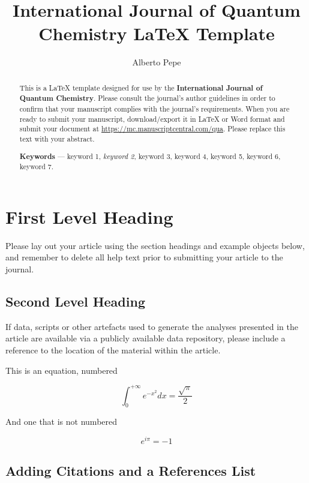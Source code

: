 \documentclass[num-refs]{wiley-article}
\title{International Journal of Quantum Chemistry LaTeX Template}
\author[1]{Alberto Pepe}
\affil[1]{Authorea}
\begin{document}
\maketitle
{}
\begin{abstract}
This is a LaTeX template designed for use by the \textbf{International Journal of Quantum Chemistry}. Please consult the journal's author guidelines in order to confirm that your manuscript complies with the journal's requirements. When you are ready to submit your manuscript, download/export it in LaTeX or Word format and submit your document at \href{https://mc.manuscriptcentral.com/qua}{https://mc.manuscriptcentral.com/qua}. Please replace this text with your abstract.

\textbf{Keywords} --- keyword 1, \emph{keyword 2}, keyword 3, keyword 4, keyword 5, keyword 6, keyword 7.%
\end{abstract}%




\section{First Level Heading}
Please lay out your article using the section headings and example objects below, and remember to delete all help text prior to submitting your article to the journal.

\subsection{Second Level Heading}
If data, scripts or other artefacts used to generate the analyses presented in the article are available via a publicly available data repository, please include a reference to the location of the material within the article.

This is an equation, numbered

\begin{equation}
\label{eqn:some}
\int_0^{+\infty}e^{-x^2}dx=\frac{\sqrt{\pi}}{2}
\end{equation}

And one that is not numbered

\begin{equation*}
e^{i\pi}=-1
\end{equation*}

\subsection{Adding Citations and a References List}
\end{document}
